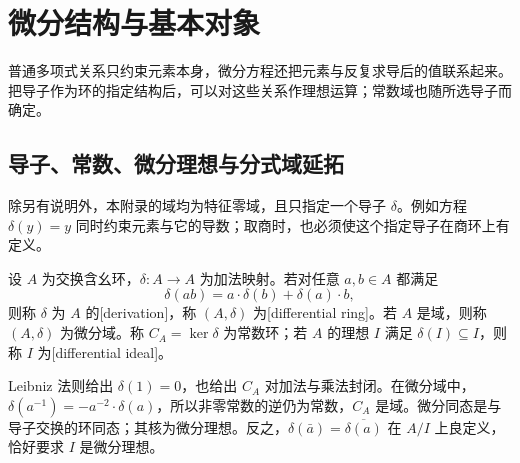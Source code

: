 
\section{微分结构与基本对象}
\label{b3:sec:E01}

普通多项式关系只约束元素本身，微分方程还把元素与反复求导后的值联系起来。把导子作为环的指定结构后，可以对这些关系作理想运算；常数域也随所选导子而确定。


\subsection{导子、常数、微分理想与分式域延拓}
\label{b3:subsec:E01:01}

除另有说明外，本附录的域均为特征零域，且只指定一个导子 \(\delta\)。例如方程 \(\delta(y)=y\) 同时约束元素与它的导数；取商时，也必须使这个指定导子在商环上有定义。

\begin{definition}\label{b3:def:differential-ring}
	设 \(A\) 为交换含幺环，\(\delta:A\to A\) 为加法映射。若对任意 \(a,b\in A\) 都满足
	\[
		\delta(ab)=a\cdot\delta(b)+\delta(a)\cdot b,
	\]
	则称 \(\delta\) 为 \(A\) 的[derivation]，称 \((A,\delta)\) 为[differential ring]。若 \(A\) 是域，则称 \((A,\delta)\) 为微分域。称 \(C_A=\ker\delta\) 为常数环；若 \(A\) 的理想 \(I\) 满足 \(\delta(I)\subseteq I\)，则称 \(I\) 为[differential ideal]。
\end{definition}

Leibniz 法则给出 \(\delta(1)=0\)，也给出 \(C_A\) 对加法与乘法封闭。在微分域中，\(\delta(a^{-1})=-a^{-2}\cdot\delta(a)\)，所以非零常数的逆仍为常数，\(C_A\) 是域。微分同态是与导子交换的环同态；其核为微分理想。反之，\(\delta(\bar a)=\overline{\delta(a)}\) 在 \(A/I\) 上良定义，恰好要求 \(I\) 是微分理想。

